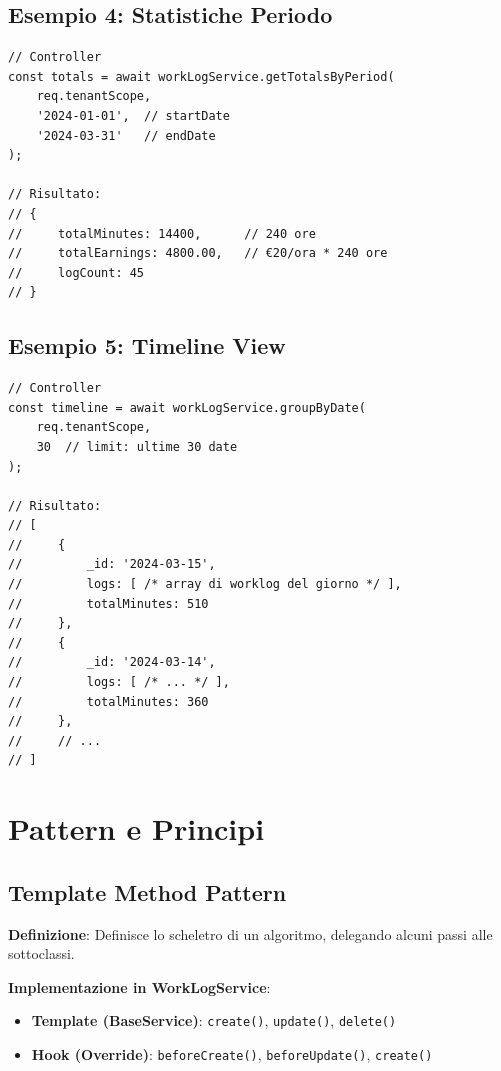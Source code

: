 \documentclass[11pt,a4paper]{article}
\begin{document}
\subsection{Esempio 4: Statistiche Periodo}

\begin{lstlisting}
// Controller
const totals = await workLogService.getTotalsByPeriod(
    req.tenantScope,
    '2024-01-01',  // startDate
    '2024-03-31'   // endDate
);

// Risultato:
// {
//     totalMinutes: 14400,      // 240 ore
//     totalEarnings: 4800.00,   // €20/ora * 240 ore
//     logCount: 45
// }
\end{lstlisting}

\subsection{Esempio 5: Timeline View}

\begin{lstlisting}
// Controller
const timeline = await workLogService.groupByDate(
    req.tenantScope,
    30  // limit: ultime 30 date
);

// Risultato:
// [
//     {
//         _id: '2024-03-15',
//         logs: [ /* array di worklog del giorno */ ],
//         totalMinutes: 510
//     },
//     {
//         _id: '2024-03-14',
//         logs: [ /* ... */ ],
//         totalMinutes: 360
//     },
//     // ...
// ]
\end{lstlisting}

\section{Pattern e Principi}

\subsection{Template Method Pattern}

\textbf{Definizione}: Definisce lo scheletro di un algoritmo, delegando alcuni passi alle sottoclassi.

\textbf{Implementazione in WorkLogService}:
\begin{itemize}
    \item \textbf{Template (BaseService)}: \texttt{create()}, \texttt{update()}, \texttt{delete()}
    \item \textbf{Hook (Override)}: \texttt{beforeCreate()}, \texttt{beforeUpdate()}, \texttt{create()}
\end{itemize}
\end{document}
